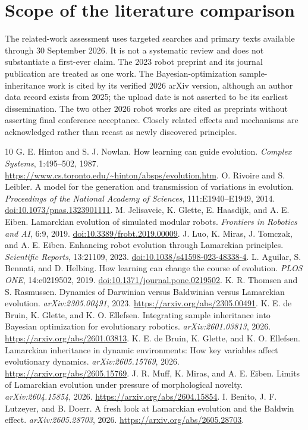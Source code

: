 \documentclass[11pt]{article}
\begin{document}
\section{Scope of the literature comparison}
The related-work assessment uses targeted searches and primary texts available through 30 September 2026. It is not a systematic review and does not substantiate a first-ever claim. The 2023 robot preprint and its journal publication are treated as one work. The Bayesian-optimization sample-inheritance work is cited by its verified 2026 arXiv version, although an author data record exists from 2025; the upload date is not asserted to be its earliest dissemination. The two other 2026 robot works are cited as preprints without asserting final conference acceptance. Closely related effects and mechanisms are acknowledged rather than recast as newly discovered principles.

\begin{thebibliography}{10}
 G. E. Hinton and S. J. Nowlan. How learning can guide evolution. \emph{Complex Systems}, 1:495--502, 1987. \url{https://www.cs.toronto.edu/~hinton/absps/evolution.htm}.
 O. Rivoire and S. Leibler. A model for the generation and transmission of variations in evolution. \emph{Proceedings of the National Academy of Sciences}, 111:E1940--E1949, 2014. \href{https://doi.org/10.1073/pnas.1323901111}{doi:10.1073/pnas.1323901111}.
 M. Jelisavcic, K. Glette, E. Haasdijk, and A. E. Eiben. Lamarckian evolution of simulated modular robots. \emph{Frontiers in Robotics and AI}, 6:9, 2019. \href{https://doi.org/10.3389/frobt.2019.00009}{doi:10.3389/frobt.2019.00009}.
 J. Luo, K. Miras, J. Tomczak, and A. E. Eiben. Enhancing robot evolution through Lamarckian principles. \emph{Scientific Reports}, 13:21109, 2023. \href{https://doi.org/10.1038/s41598-023-48338-4}{doi:10.1038/s41598-023-48338-4}.
 L. Aguilar, S. Bennati, and D. Helbing. How learning can change the course of evolution. \emph{PLOS ONE}, 14:e0219502, 2019. \href{https://doi.org/10.1371/journal.pone.0219502}{doi:10.1371/journal.pone.0219502}.
 K. R. Thomsen and S. Rasmussen. Dynamics of Darwinian versus Baldwinian versus Lamarckian evolution. \emph{arXiv:2305.00491}, 2023. \url{https://arxiv.org/abs/2305.00491}.
 K. E. de Bruin, K. Glette, and K. O. Ellefsen. Integrating sample inheritance into Bayesian optimization for evolutionary robotics. \emph{arXiv:2601.03813}, 2026. \url{https://arxiv.org/abs/2601.03813}.
 K. E. de Bruin, K. Glette, and K. O. Ellefsen. Lamarckian inheritance in dynamic environments: How key variables affect evolutionary dynamics. \emph{arXiv:2605.15769}, 2026. \url{https://arxiv.org/abs/2605.15769}.
 J. R. Muff, K. Miras, and A. E. Eiben. Limits of Lamarckian evolution under pressure of morphological novelty. \emph{arXiv:2604.15854}, 2026. \url{https://arxiv.org/abs/2604.15854}.
 I. Benito, J. F. Lutzeyer, and B. Doerr. A fresh look at Lamarckian evolution and the Baldwin effect. \emph{arXiv:2605.28703}, 2026. \url{https://arxiv.org/abs/2605.28703}.
\end{thebibliography}
\end{document}
